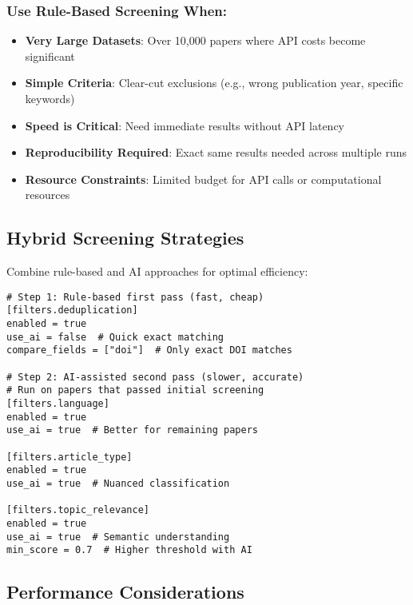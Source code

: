 \subsubsection{Use Rule-Based Screening When:}

\begin{itemize}
    \item \textbf{Very Large Datasets}: Over 10,000 papers where API costs become significant
    \item \textbf{Simple Criteria}: Clear-cut exclusions (e.g., wrong publication year, specific keywords)
    \item \textbf{Speed is Critical}: Need immediate results without API latency
    \item \textbf{Reproducibility Required}: Exact same results needed across multiple runs
    \item \textbf{Resource Constraints}: Limited budget for API calls or computational resources
\end{itemize}

\subsection{Hybrid Screening Strategies}

Combine rule-based and AI approaches for optimal efficiency:

\begin{configbox}
\begin{lstlisting}
# Step 1: Rule-based first pass (fast, cheap)
[filters.deduplication]
enabled = true
use_ai = false  # Quick exact matching
compare_fields = ["doi"]  # Only exact DOI matches

# Step 2: AI-assisted second pass (slower, accurate)
# Run on papers that passed initial screening
[filters.language]
enabled = true
use_ai = true  # Better for remaining papers

[filters.article_type]
enabled = true
use_ai = true  # Nuanced classification

[filters.topic_relevance]
enabled = true
use_ai = true  # Semantic understanding
min_score = 0.7  # Higher threshold with AI
\end{lstlisting}
\end{configbox}

\subsection{Performance Considerations}

